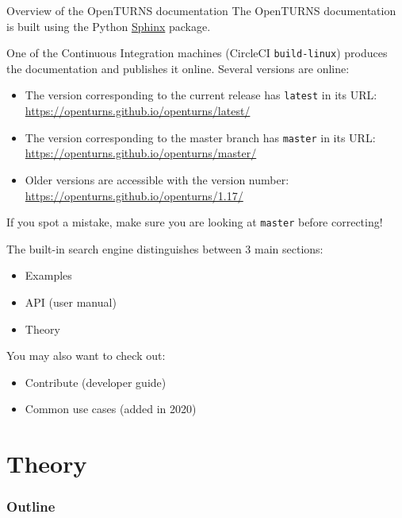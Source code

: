 \documentclass[8pt]{beamer}
\begin{document}

\begin{frame}{Overview of the OpenTURNS documentation}
The OpenTURNS documentation is built using the Python \href{https://www.sphinx-doc.org/en/master/index.html}{\alert{Sphinx}} package.

One of the Continuous Integration machines (CircleCI \texttt{build-linux})
produces the documentation and publishes it online.
Several versions are online:

\begin{itemize}
\item The version corresponding to the current release has \alert{\texttt{latest}} in its URL:
\url{https://openturns.github.io/openturns/latest/}
\item The version corresponding to the master branch has \alert{\texttt{master}} in its URL:
\url{https://openturns.github.io/openturns/master/}
\item Older versions are accessible with the version number: \url{https://openturns.github.io/openturns/1.17/}
\end{itemize}

If you spot a mistake, make sure you are looking at \texttt{master} before correcting!

The built-in search engine distinguishes between 3 main sections:

\begin{itemize}
    \item \alert{Examples}
    \item \alert{API} (user manual)
    \item \alert{Theory}
\end{itemize}

You may also want to check out:

\begin{itemize}
    \item \alert{Contribute} (developer guide)
    \item \alert{Common use cases} (added in 2020)
\end{itemize}
\end{frame}

\section{Theory}

\begin{frame}[label=tableofcontents]
\frametitle{Outline}
\tableofcontents[currentsection]
\end{frame}
\end{document}
